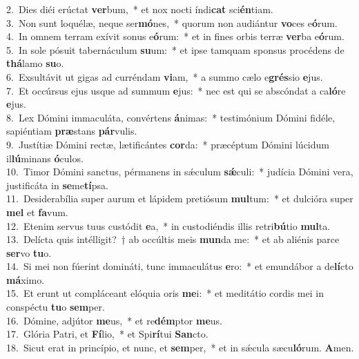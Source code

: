 {2.~}Dies diéi erúctat \textbf{ver}bum,~* et nox nocti índi\textbf{cat} sci\textbf{én}tiam.\\
{3.~}Non sunt loquélæ, neque ser\textbf{mó}nes,~* quorum non audiántur \textbf{vo}ces e\textbf{ó}rum.\\
{4.~}In omnem terram exívit sonus e\textbf{ó}rum:~* et in fines orbis terræ \textbf{ver}ba e\textbf{ó}rum.\\
{5.~}In sole pósuit tabernáculum \textbf{su}um:~* et ipse tamquam sponsus procédens de \textbf{thá}lamo \textbf{su}o.\\
{6.~}Exsultávit ut gigas ad curréndam \textbf{vi}am,~* a summo cælo e\textbf{grés}sio \textbf{e}jus.\\
{7.~}Et occúrsus ejus usque ad summum \textbf{e}jus:~* nec est qui se abscóndat a ca\textbf{ló}re \textbf{e}jus.\\
{8.~}Lex Dómini immaculáta, convértens \textbf{á}nimas:~* testimónium Dómini fidéle, sapiéntiam \textbf{præ}stans \textbf{pár}vulis.\\
{9.~}Justítiæ Dómini rectæ, lætificántes \textbf{cor}da:~* præcéptum Dómini lúcidum il\textbf{lú}minans \textbf{ó}culos.\\
{10.~}Timor Dómini sanctus, pérmanens in sǽculum \textbf{sǽ}culi:~* judícia Dómini vera, justificáta in \textbf{se}me\textbf{tí}psa.\\
{11.~}Desiderabília super aurum et lápidem pretiósum \textbf{mul}tum:~* et dulcióra super \textbf{mel} et \textbf{fa}vum.\\
{12.~}Etenim servus tuus custódit \textbf{e}a,~* in custodiéndis illis retri\textbf{bú}tio \textbf{mul}ta.\\
{13.~}Delícta quis intélligit?~† ab occúltis meis \textbf{mun}da me:~* et ab aliénis parce \textbf{ser}vo \textbf{tu}o.\\
{14.~}Si mei non fúerint domináti, tunc immaculátus \textbf{e}ro:~* et emundábor a de\textbf{lí}cto \textbf{má}ximo.\\
{15.~}Et erunt ut compláceant elóquia oris \textbf{me}i:~* et meditátio cordis mei in conspéctu \textbf{tu}o \textbf{sem}per.\\
{16.~}Dómine, adjútor \textbf{me}us,~* et re\textbf{dém}ptor \textbf{me}us.\\
{17.~}Glória Patri, et \textbf{Fí}lio,~* et Spi\textbf{rí}tui \textbf{San}cto.\\
{18.~}Sicut erat in princípio, et nunc, et \textbf{sem}per,~* et in sǽcula sæcu\textbf{ló}rum. \textbf{A}men.\\
